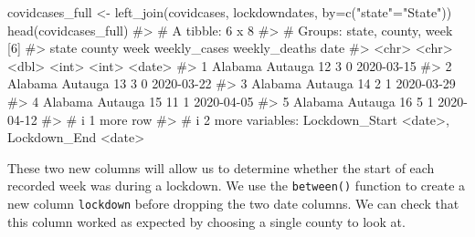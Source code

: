 \documentclass[
  letterpaper,
]{krantz}
\makeatletter
\newenvironment{Shaded}{\begin{snugshade}}{\end{snugshade}}
\newcommand{\AttributeTok}[1]{\textcolor[rgb]{0.40,0.45,0.13}{#1}}
\newcommand{\CommentTok}[1]{\textcolor[rgb]{0.37,0.37,0.37}{#1}}
\newcommand{\FunctionTok}[1]{\textcolor[rgb]{0.28,0.35,0.67}{#1}}
\newcommand{\NormalTok}[1]{\textcolor[rgb]{0.00,0.23,0.31}{#1}}
\newcommand{\OtherTok}[1]{\textcolor[rgb]{0.00,0.23,0.31}{#1}}
\newcommand{\StringTok}[1]{\textcolor[rgb]{0.13,0.47,0.30}{#1}}
\newenvironment{kframe}{%
\medskip{}
\setlength{\fboxsep}{.8em}
 \def\at@end@of@kframe{}%
 \ifinner\ifhmode%
  \def\at@end@of@kframe{\end{minipage}}%
  \begin{minipage}{\columnwidth}%
 \fi\fi%
 \def\FrameCommand##1{\hskip\@totalleftmargin \hskip-\fboxsep
 \colorbox{shadecolor}{##1}\hskip-\fboxsep
     \hskip-\linewidth \hskip-\@totalleftmargin \hskip\columnwidth}%
 \MakeFramed {\advance\hsize-\width
   \@totalleftmargin\z@ \linewidth\hsize
   \@setminipage}}%
 {\par\unskip\endMakeFramed%
 \at@end@of@kframe}
\renewenvironment{Shaded}{\begin{kframe}}{\end{kframe}}
\makeatother
\begin{document}
\begin{Shaded}
\begin{Highlighting}[]
\NormalTok{covidcases\_full }\OtherTok{\textless{}{-}} \FunctionTok{left\_join}\NormalTok{(covidcases, lockdowndates, }
                             \AttributeTok{by=}\FunctionTok{c}\NormalTok{(}\StringTok{"state"}\OtherTok{=}\StringTok{"State"}\NormalTok{))}
\FunctionTok{head}\NormalTok{(covidcases\_full)}
\CommentTok{\#\textgreater{} \# A tibble: 6 x 8}
\CommentTok{\#\textgreater{} \# Groups:   state, county, week [6]}
\CommentTok{\#\textgreater{}   state   county   week weekly\_cases weekly\_deaths date      }
\CommentTok{\#\textgreater{}   \textless{}chr\textgreater{}   \textless{}chr\textgreater{}   \textless{}dbl\textgreater{}        \textless{}int\textgreater{}         \textless{}int\textgreater{} \textless{}date\textgreater{}    }
\CommentTok{\#\textgreater{} 1 Alabama Autauga    12            3             0 2020{-}03{-}15}
\CommentTok{\#\textgreater{} 2 Alabama Autauga    13            3             0 2020{-}03{-}22}
\CommentTok{\#\textgreater{} 3 Alabama Autauga    14            2             1 2020{-}03{-}29}
\CommentTok{\#\textgreater{} 4 Alabama Autauga    15           11             1 2020{-}04{-}05}
\CommentTok{\#\textgreater{} 5 Alabama Autauga    16            5             1 2020{-}04{-}12}
\CommentTok{\#\textgreater{} \# i 1 more row}
\CommentTok{\#\textgreater{} \# i 2 more variables: Lockdown\_Start \textless{}date\textgreater{}, Lockdown\_End \textless{}date\textgreater{}}
\end{Highlighting}
\end{Shaded}

These two new columns will allow us to determine whether the start of
each recorded week was during a lockdown. We use the \texttt{between()}
function to create a new column \texttt{lockdown} before dropping the
two date columns. We can check that this column worked as expected by
choosing a single county to look at.
\end{document}
